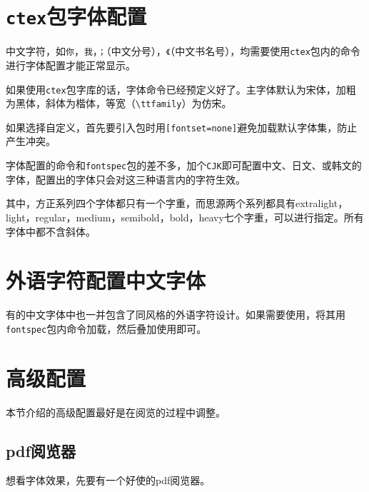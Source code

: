 \documentclass[10pt,openany]{book}
\begin{document}
\begin{sloppypar}
\section{\texttt{ctex}包字体配置}

中文字符，如\texttt{你}，\texttt{我}，\texttt{；}（中文分号），\texttt{《}（中文书名号），均需要使用\texttt{ctex}包内的命令进行字体配置才能正常显示。

如果使用\texttt{ctex}包字库的话，字体命令已经预定义好了。主字体默认为宋体，加粗为黑体，斜体为楷体，等宽（\texttt{\textbackslash{}ttfamily}）为仿宋。



如果选择自定义，首先要引入包时用\texttt{{[}fontset=none{]}}避免加载默认字体集，防止产生冲突。



字体配置的命令和\texttt{fontspec}包的差不多，加个\texttt{CJK}即可配置中文、日文、或韩文的字体，配置出的字体只会对这三种语言内的字符生效。



其中，方正系列四个字体都只有一个字重，而思源两个系列都具有extralight，light，regular，medium，semibold，bold，heavy七个字重，可以进行指定。所有字体中都不含斜体。

\section{外语字符配置中文字体}

有的中文字体中也一并包含了同风格的外语字符设计。如果需要使用，将其用\texttt{fontspec}包内命令加载，然后叠加使用即可。



\section{高级配置}

本节介绍的高级配置最好是在阅览的过程中调整。

\subsection{pdf阅览器}

想看字体效果，先要有一个好使的pdf阅览器。


\end{sloppypar}
\end{document}
